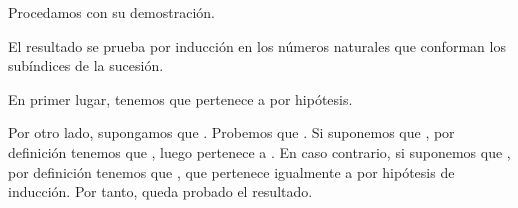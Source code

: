 \begin{isabellebody}
\begin{isamarkuptext}
  Procedamos con su demostración.

  \begin{demostracion}
    El resultado se prueba por inducción en los números naturales que conforman los subíndices de la 
    sucesión.

    En primer lugar, tenemos que  pertenece a  por hipótesis.

    Por otro lado, supongamos que . Probemos que . Si suponemos que ,
    por definición tenemos que , luego pertenece a . En caso contrario, si
    suponemos que , por definición tenemos que , que pertenece igualmente
    a  por hipótesis de inducción. Por tanto, queda probado el resultado.
  \end{demostracion}


\end{isamarkuptext}
\end{isabellebody}
